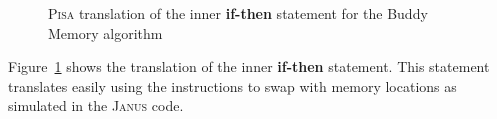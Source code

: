 \begin{figure}[ht]
    \centering
    \begin{subfigure}{.4\textwidth}
          
    \end{subfigure}
    \begin{subfigure}{.5\textwidth}
        \centering
    \end{subfigure}
    \caption{\textsc{Pisa} translation of the inner \textbf{if-then} statement for the Buddy Memory algorithm}
    \label{fig:pisa-buddy-inner-if}
\end{figure}

Figure~\ref{fig:pisa-buddy-inner-if} shows the translation of the inner \textbf{if-then} statement. This statement translates easily using the  instructions to swap with memory locations as simulated in the \textsc{Janus} code. 

